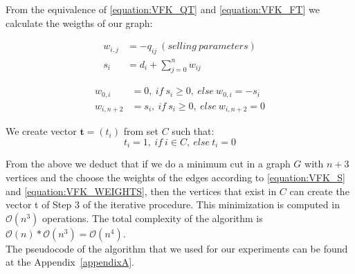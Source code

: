 \documentclass{amsart}
\numberwithin{equation}{section}
\begin{document}
From the equivalence of \eqref{equation:VFK_QT} and \eqref{equation:VFK_FT} we calculate the weigths of our graph:

\begin{equation}
\begin{split}
w_{i,j} & = -q_{ij} \ (selling \ parameters) \\
s_i & = d_i + \sum_{j=0}^{n} w_{ij}
\end{split}
\label{equation:VFK_S}
\end{equation}

\begin{equation}
\begin{split}
w_{0,i} & = 0, \ if \ s_i \geq 0, \ else \ w_{0,i} = - s_i \\
w_{i,n+2} & = s_i, \ if \ s_i \geq 0, \ else \  w_{i,n+2} = 0
\end{split}
\label{equation:VFK_WEIGHTS}
\end{equation}

We create vector $\textbf{t}=(t_i)$ from set $C$ such that:
\begin{equation}
t_i = 1, \ if \ i \in C, \ else \  t_i = 0
\label{equation:VFK_WEIGHTS}
\end{equation}

From the above we deduct that if we do a minimum cut in a graph $G$ with $n+3$ vertices and the choose the weights of the edges according to \eqref{equation:VFK_S} and \eqref{equation:VFK_WEIGHTS}, then the vertices that exist in $C$ can create the vector t of Step 3 of the iterative procedure. This minimization is computed in $\mathcal{O}(n^3)$ operations. The total complexity of the algorithm is  $\mathcal{O}(n)*\mathcal{O}(n^3)=\mathcal{O}(n^4)$. \\

The pseudocode of the algorithm that we used for our experiments can be found at the Appendix~\ref{appendixA}.
\end{document}
